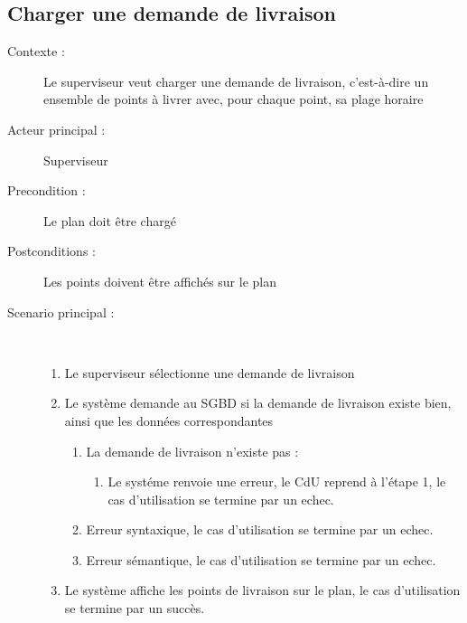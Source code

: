 \subsection{Charger une demande de livraison}
\begin{description}
    \item[Contexte :] Le superviseur veut charger une demande de livraison, c'est-\`a-dire un ensemble de points \`a livrer avec, pour chaque point, sa
    plage horaire
    \item[Acteur principal :] Superviseur
    \item[Precondition :] Le plan doit \^etre charg\'e
    \item[Postconditions :] Les points doivent \^etre affich\'es sur le plan
    \item[Scenario principal :] ~
    \begin{enumerate}
        \item Le superviseur s\'electionne une demande de livraison
        \item Le syst\`eme demande au SGBD si la demande de livraison existe bien, ainsi que les donn\'ees correspondantes
        \begin{enumerate}
            \item La demande de livraison n'existe pas :
            \begin{enumerate}
                \item Le syst\'eme renvoie une erreur, le CdU reprend \`a l'\'etape 1, le cas d'utilisation se termine par un echec.
            \end{enumerate}
            \item Erreur syntaxique, le cas d'utilisation se termine par un echec.
            \item Erreur s\'emantique, le cas d'utilisation se termine par un echec.
        \end{enumerate}
        \item Le syst\`eme affiche les points de livraison sur le plan, le cas d'utilisation se termine par un succ\`es.
    \end{enumerate}
\end{description}

